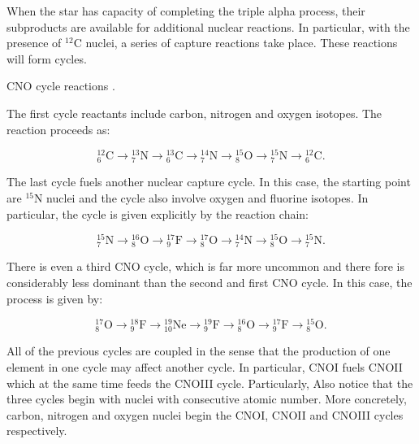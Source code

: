 \documentclass[openany]{book}
\begin{document}
When the star has capacity of completing the triple alpha process, their subproducts are available for additional nuclear reactions. In particular, with the presence of $\mathrm{{}^{12}C}$ nuclei, a series of capture reactions take place. These reactions will form cycles.

CNO cycle reactions \cite{wiescher_gorres_schatz_1999}.

 The first cycle reactants include carbon, nitrogen and oxygen isotopes. The reaction proceeds as:  

\begin{equation} \label{eq:reaction_CNO_C}
	\mathrm{{}_{6}^{12}C  \rightarrow {}^{13}_{7}N  \rightarrow {}^{13}_{6}C  \rightarrow {}^{14}_{7}N  \rightarrow {}^{15}_{8}O  \rightarrow {}^{15}_{7}N \rightarrow {}^{12}_{6}C}.
\end{equation}



The last cycle fuels another nuclear capture cycle. In this case, the starting point are $\mathrm{{}^{15}N}$ nuclei and the cycle also involve oxygen and fluorine isotopes. In particular, the cycle is given explicitly by the reaction chain: 

\begin{equation} \label{eq:reaction_CNO_N}
	\mathrm{{}_{7}^{15}N  \rightarrow {}^{16}_{8}O  \rightarrow {}^{17}_{9}F  \rightarrow {}^{17}_{8}O  \rightarrow {}^{14}_{7}N  \rightarrow {}^{15}_{8}O \rightarrow {}^{15}_{7}N  }.
\end{equation}

There is even a third CNO cycle, which is far more uncommon and there fore is considerably less dominant than the second and first CNO cycle. In this case, the process is given by: 

\begin{equation} \label{eq:reaction_CNO_O}
	\mathrm{{}_{8}^{17}O  \rightarrow {}^{18}_{9}F  \rightarrow {}^{19}_{10}Ne  \rightarrow {}^{19}_{9}F  \rightarrow {}^{16}_{8}O  \rightarrow {}^{17}_{9}F \rightarrow {}^{15}_{8}O  }.
\end{equation}

All of the previous cycles are coupled in the sense that the production of one element in one cycle may affect another cycle. In particular, CNOI fuels CNOII which at the same time feeds the CNOIII cycle. Particularly, Also notice that the three cycles begin with nuclei with consecutive atomic number. More concretely, carbon, nitrogen and oxygen nuclei begin the CNOI, CNOII and CNOIII cycles respectively.\\
\end{document}

